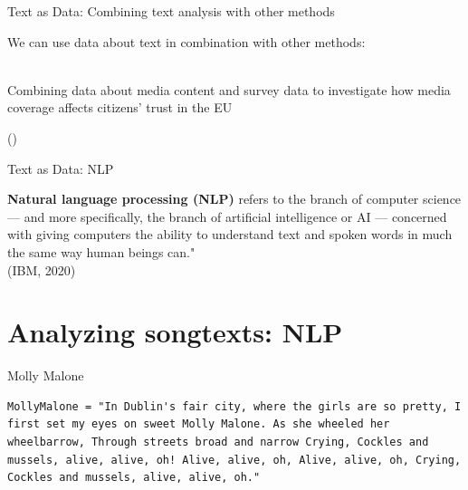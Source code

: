 \documentclass[handout]{beamer}
\begin{document}
\begin{frame}{Text as Data: \small{Combining text analysis with other methods}}
	
	We can use data about text in combination with other methods: \\~
	
	Combining data about media content and survey data to investigate how media coverage affects citizens' trust in the EU \\
	\begin{tiny}
		(\cite{brosius_trust_2019}) \\
	\end{tiny}
	
	

	
\end{frame}


\begin{frame}{Text as Data: NLP}
	
	\textbf{Natural language processing (NLP)} refers to the branch of computer science — and more specifically, the branch of artificial intelligence or AI — concerned with giving computers the ability to understand text and spoken words in much the same way human beings can."  \\
	\tiny{(IBM, 2020)}
	
	
	
\end{frame}





\section{Analyzing songtexts: NLP}

\begin{frame}[fragile]{Molly Malone}
	
\begin{lstlisting} 
MollyMalone = "In Dublin's fair city, where the girls are so pretty, I first set my eyes on sweet Molly Malone. As she wheeled her wheelbarrow, Through streets broad and narrow Crying, Cockles and mussels, alive, alive, oh! Alive, alive, oh, Alive, alive, oh, Crying, Cockles and mussels, alive, alive, oh."  
\end{lstlisting}
	


\end{frame}
\end{document}
